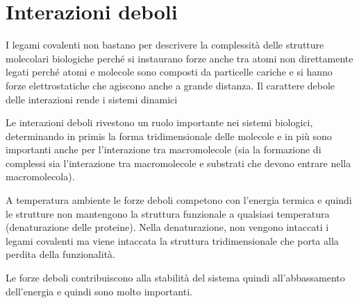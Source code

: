 \chapter{Interazioni deboli}

I legami covalenti non bastano per descrivere la complessità delle
strutture molecolari biologiche perché si instaurano forze anche tra
atomi non direttamente legati perché atomi e molecole sono composti da
particelle cariche e si hanno forze elettrostatiche che agiscono anche a
grande distanza.
Il carattere debole delle interazioni rende i sistemi dinamici



Le interazioni deboli rivestono un ruolo importante nei sistemi
biologici, determinando in primis la forma tridimensionale delle
molecole e in più sono importanti anche per l'interazione tra
macromolecole (sia la formazione di complessi sia l'interazione tra
macromolecole e substrati che devono entrare nella macromolecola).


A temperatura ambiente le forze deboli competono con l'energia termica e
quindi le strutture non mantengono la struttura funzionale a qualsiasi
temperatura (denaturazione delle proteine).
Nella denaturazione, non vengono intaccati i legami covalenti ma viene intaccata la
struttura tridimensionale che porta alla perdita della funzionalità.

Le forze deboli contribuiscono alla stabilità del sistema quindi
all'abbassamento dell'energia e quindi sono molto importanti.




